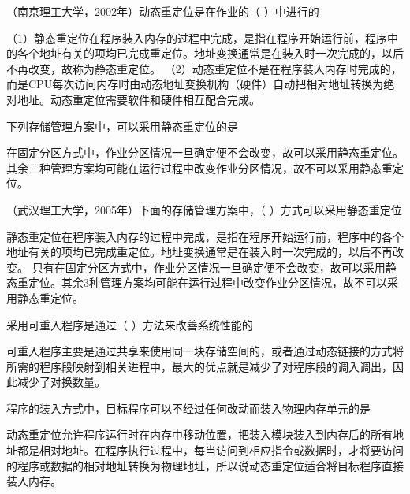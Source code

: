 \question （南京理工大学，2002年）动态重定位是在作业的（ ）中进行的
\par{}
\begin{solution}（1）静态重定位在程序装入内存的过程中完成，是指在程序开始运行前，程序中的各个地址有关的项均已完成重定位。地址变换通常是在装入时一次完成的，以后不再改变，故称为静态重定位。
（2）动态重定位不是在程序装入内存时完成的，而是CPU每次访问内存时由动态地址变换机构（硬件）自动把相对地址转换为绝对地址。动态重定位需要软件和硬件相互配合完成。
\end{solution}
\question 下列存储管理方案中，可以采用静态重定位的是
\par{}
\begin{solution}在固定分区方式中，作业分区情况一旦确定便不会改变，故可以采用静态重定位。其余三种管理方案均可能在运行过程中改变作业分区情况，故不可以采用静态重定位。
\end{solution}
\question （武汉理工大学，2005年）下面的存储管理方案中，（
）方式可以采用静态重定位
\par{}
\begin{solution}静态重定位在程序装入内存的过程中完成，是指在程序开始运行前，程序中的各个地址有关的项均已完成重定位。地址变换通常是在装入时一次完成的，以后不再改变。
只有在固定分区方式中，作业分区情况一旦确定便不会改变，故可以采用静态重定位。其余3种管理方案均可能在运行过程中改变作业分区情况，故不可以采用静态重定位。
\end{solution}
\question 采用可重入程序是通过（ ）方法来改善系统性能的
\par{}
\begin{solution}可重入程序主要是通过共享来使用同一块存储空间的，或者通过动态链接的方式将所需的程序段映射到相关进程中，最大的优点就是减少了对程序段的调入调出，因此减少了对换数量。
\end{solution}
\question 程序的装入方式中，目标程序可以不经过任何改动而装入物理内存单元的是
\par{}
\begin{solution}动态重定位允许程序运行时在内存中移动位置，把装入模块装入到内存后的所有地址都是相对地址。在程序执行过程中，每当访问到相应指令或数据时，才将要访问的程序或数据的相对地址转换为物理地址，所以说动态重定位适合将目标程序直接装入内存。
\end{solution}
